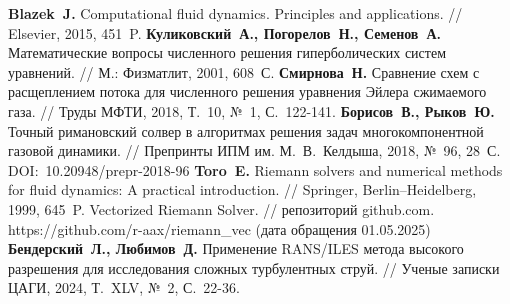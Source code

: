 \begin{thebibliography}{99}
%
\textbf{Blazek~J.} Computational fluid dynamics. Principles and applications. // Elsevier, 2015, 451~P.
%
\textbf{Куликовский~А., Погорелов~Н., Семенов~А.} Математические вопросы численного решения гиперболических систем уравнений. // М.: Физматлит, 2001, 608~С.
%
\textbf{Смирнова~Н.} Сравнение схем с расщеплением потока для численного решения уравнения Эйлера сжимаемого газа. // Труды МФТИ, 2018, Т.~10, №~1, С.~122-141.
%
\textbf{Борисов~В., Рыков~Ю.} Точный римановский солвер в алгоритмах решения задач многокомпонентной газовой динамики. // Препринты ИПМ им. М.~В.~Келдыша, 2018, №~96, 28~С. DOI:~10.20948/prepr-2018-96
%
\textbf{Toro~E.} Riemann solvers and numerical methods for fluid dynamics: A practical introduction. // Springer, Berlin–Heidelberg, 1999, 645~P.
%
Vectorized Riemann Solver. // репозиторий github.com. https://github.com/r-aax/riemann\_vec (дата обращения 01.05.2025)
%
\textbf{Бендерский~Л., Любимов~Д.} Применение RANS/ILES метода высокого разрешения для исследования сложных турбулентных струй. // Ученые записки ЦАГИ, 2024, Т.~XLV, №~2, С.~22-36. 
%




\end{thebibliography}

